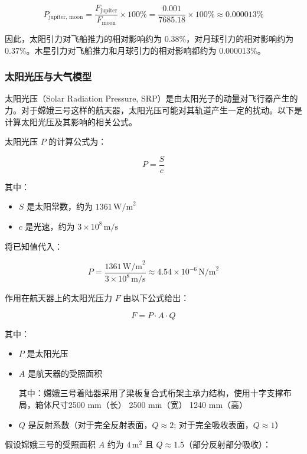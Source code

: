 \documentclass{ctexart}
\begin{document}
\begin{equation*}
P_{\text{jupiter, moon}} = \frac{F_{\text{jupiter}}}{F_{\text{moon}}} \times 100\% = \frac{0.001}{7685.18} \times 100\% \approx 0.000013\%
\end{equation*}

因此，太阳引力对飞船推力的相对影响约为 0.38\%，对月球引力的相对影响约为 0.37\%。木星引力对飞船推力和月球引力的相对影响都约为 0.000013\%。

\subsubsection{太阳光压与大气模型}
太阳光压（Solar Radiation Pressure, SRP）是由太阳光子的动量对飞行器产生的力。对于嫦娥三号这样的航天器，太阳光压可能对其轨道产生一定的扰动。以下是计算太阳光压及其影响的相关公式。


太阳光压 \( P \) 的计算公式为：

\[
P = \frac{S}{c}
\]

其中：
\begin{itemize}
	\renewcommand\labelitemi{} %
    \item \( S \) 是太阳常数，约为 \( 1361 \, \text{W/m}^2 \)
    \item \( c \) 是光速，约为 \( 3 \times 10^8 \, \text{m/s} \)
\end{itemize}

将已知值代入：

\[
P = \frac{1361 \, \text{W/m}^2}{3 \times 10^8 \, \text{m/s}} \approx 4.54 \times 10^{-6} \, \text{N/m}^2
\]

作用在航天器上的太阳光压力 \( F \) 由以下公式给出：

\[
F = P \cdot A \cdot Q
\]

其中：
\begin{itemize}
	\renewcommand\labelitemi{} %
    \item \( P \) 是太阳光压
    \item \( A \) 是航天器的受照面积

其中：嫦娥三号着陆器采用了梁板复合式桁架主承力结构，使用十字支撑布局，箱体尺寸2500 mm（长） 2500 mm（宽） 1240 mm（高）

    \item \( Q \) 是反射系数（对于完全反射表面，\( Q \approx 2 \); 对于完全吸收表面，\( Q \approx 1 \)）
\end{itemize}

假设嫦娥三号的受照面积 \( A \) 约为 \( 4 \, \text{m}^2 \) 且 \( Q \approx 1.5 \)（部分反射部分吸收）：
\end{document}
